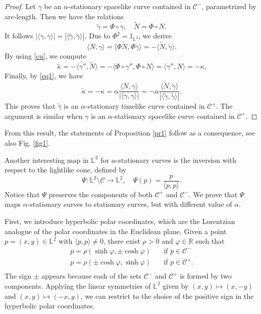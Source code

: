 \documentclass[a4paper,12pt]{amsart}
\theoremstyle{definition}
\def\r{\mathbb R}
\def\l{\mathbb L}
\begin{document}
\begin{proof}
Let $\gamma$ be an $\alpha$-stationary spacelike curve contained in $\mathcal{C}^-$, parametrized by arc-length. Then we have the relations
$$\widetilde{\gamma}=\Phi\circ\gamma,\quad \widetilde{N}=\Phi\circ N.$$
It follows $|\langle\gamma,\gamma\rangle|=|\langle\widetilde{\gamma},\widetilde{\gamma}\rangle|$. Due to $\Phi^2=1_{\l^2}$, we derive
$$\langle N,\gamma\rangle=\langle\Phi\widetilde{N},\Phi\widetilde{\gamma}\rangle=-\langle\widetilde{N},\widetilde{\gamma}\rangle.$$
By using \eqref{cu}, we compute
$$\widetilde{\kappa}=-\langle\widetilde{\gamma''},\widetilde{N}\rangle=-\langle\Phi\circ\gamma'',\Phi \circ N\rangle=\langle\gamma'',N\rangle=-\kappa.$$
Finally, by \eqref{eq1}, we have
$$\widetilde{\kappa}=- \kappa=\alpha\frac{\langle N,\gamma\rangle}{|\langle\gamma,\gamma\rangle|}=-\alpha\frac{\langle \widetilde{N},\widetilde{\gamma}\rangle}{|\langle\widetilde{\gamma},\widetilde{\gamma}\rangle|}.$$
This proves that $\widetilde{\gamma}$ is an $\alpha$-stationary timelike curve contained in $\mathcal{C}^+$. The argument is similar when $\gamma$ is an $\alpha$-stationary spacelike curve contained in   $\mathcal{C}^+$.
\end{proof}
 
From this result, the statements of Proposition \ref{pr1} follow as a consequence, see also Fig. \ref{fig1}.
 
Another interesting map in $\l^2$ for $\alpha$-stationary curves is the inversion with respect to the lightlike cone, defined by
$$\Psi\colon\l^2\setminus\mathcal{C}\to\l^2,\quad \Psi(p)=\frac{p}{\langle p,p\rangle}.$$
Notice that $\Psi$ preserves the components of both $\mathcal{C}^+$ and $\mathcal{C}^-$. 
We prove that $\Psi$ maps $\alpha$-stationary curves to stationary curves, but with different value of $\alpha$. 

First, we introduce hyperbolic polar coordinates, which are the Lorentzian analogue of the polar coordinates in the Euclidean plane. Given a point $p=(x,y)\in\l^2$ with $\langle p,p\rangle\not=0$,   there exist $\rho>0$ and $\varphi\in\r$ such that 
\begin{equation*}
\begin{split}
p=\rho(\sinh\varphi,\pm\cosh\varphi) &\quad \mbox{if $p\in\mathcal{C}^-$}\\
p=\rho(\pm\cosh\varphi,\sinh\varphi) &\quad \mbox{if $p\in\mathcal{C}^+$.}\\
\end{split}
\end{equation*}
The sign $\pm$ appears because each of the sets $\mathcal{C}^-$ and $\mathcal{C}^+$ is formed by two components. Applying the linear symmetries of $\l^2$ given by  $(x,y)\mapsto (x,-y)$ and $(x,y)\mapsto (-x,y)$, we can restrict to the choice of the positive sign in the hyperbolic polar coordinates. 
\end{document}

